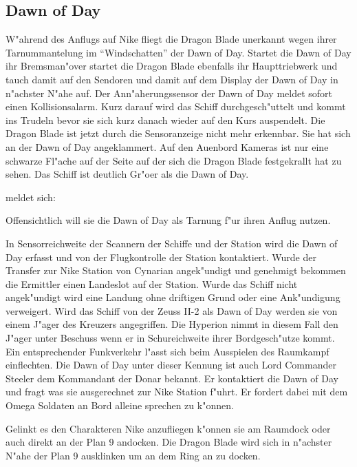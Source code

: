\subsection{Dawn of Day}
W"ahrend des Anflugs auf Nike fliegt die Dragon Blade unerkannt wegen ihrer Tarnummantelung im "`Windschatten"' der Dawn of Day. Startet die Dawn of Day ihr Bremsman"over startet die Dragon Blade ebenfalls ihr Haupttriebwerk und tauch damit auf den Sendoren und damit auf dem Display der Dawn of Day in n"achster N"ahe auf. Der Ann"aherungssensor der Dawn of Day meldet sofort einen Kollisionsalarm. Kurz darauf wird das Schiff durchgesch"uttelt und kommt ins Trudeln bevor sie sich kurz danach wieder auf den Kurs auspendelt. Die Dragon Blade ist jetzt durch die Sensoranzeige nicht mehr erkennbar. Sie hat sich an der Dawn of Day angeklammert. Auf den Au\3enbord Kameras ist nur eine schwarze Fl"ache auf der Seite auf der sich die Dragon Blade festgekrallt hat zu sehen. Das Schiff ist deutlich Gr"o\3er als die Dawn of Day.

\xl{} meldet sich:


Offensichtlich will sie die Dawn of Day als Tarnung f"ur ihren Anflug nutzen.

In Sensorreichweite der  Scannern der Schiffe und der Station wird die Dawn of Day erfasst und von der Flugkontrolle der Station kontaktiert. Wurde der Transfer zur Nike Station von Cynarian angek"undigt und genehmigt bekommen die Ermittler einen Landeslot auf der Station. Wurde das Schiff nicht angek"undigt wird eine Landung ohne driftigen Grund oder eine Ank"undigung verweigert. Wird das Schiff von der Zeuss II-2 als Dawn of Day werden sie von einem J"ager des Kreuzers angegriffen. Die Hyperion nimmt in diesem Fall den J"ager unter Beschuss wenn er in Schu\3reichweite ihrer Bordgesch"utze kommt. Ein entsprechender Funkverkehr l"asst sich beim Ausspielen des Raumkampf einflechten. Die Dawn of Day unter dieser Kennung ist auch Lord Commander Steeler dem Kommandant der Donar bekannt. Er kontaktiert die Dawn of Day und fragt was sie ausgerechnet zur Nike Station f"uhrt. Er fordert dabei mit dem Omega Soldaten an Bord alleine sprechen zu k"onnen.

Gelinkt es den Charakteren Nike anzufliegen k"onnen sie am Raumdock oder auch direkt an der Plan 9 andocken. Die Dragon Blade wird sich in n"achster N"ahe der Plan 9 ausklinken um an dem Ring an zu docken.

